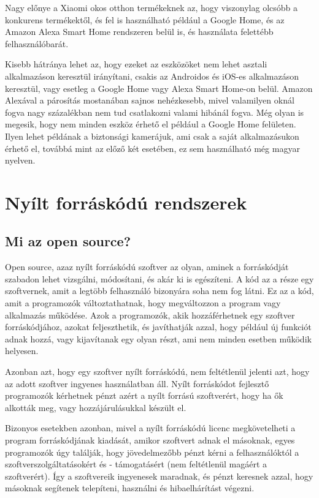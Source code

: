 \documentclass[
]{thesis-ekf}
\theoremstyle{definition}
\theoremstyle{remark}
\begin{document}
	Nagy előnye a Xiaomi okos otthon termékeknek az, hogy viszonylag olcsóbb a konkurens termékektől, és fel is használható például a Google Home, és az Amazon Alexa Smart Home rendszeren belül is, és használata felettébb felhasználóbarát.
	
	Kisebb hátránya lehet az, hogy ezeket az eszközöket nem lehet asztali alkalmazáson keresztül irányítani, csakis az Androidos és iOS-es alkalmazáson keresztül, vagy esetleg a Google Home vagy Alexa Smart Home-on belül. Amazon Alexával a párosítás mostanában sajnos nehézkesebb, mivel valamilyen oknál fogva nagy százalékban nem tud csatlakozni valami hibánál fogva. Még olyan is megesik, hogy nem minden eszköz érhető el például a Google Home felületen. Ilyen lehet példának a biztonsági kamerájuk, ami csak a saját alkalmazásukon érhető el, továbbá mint az előző két esetében, ez sem használható még magyar nyelven.
	
	\section{Nyílt forráskódú rendszerek}
	\subsection{Mi az open source?}
	Open source, azaz nyílt forráskódú szoftver az olyan, aminek a forráskódját szabadon lehet vizsgálni, módosítani, és akár ki is egészíteni. A kód az a része egy szoftvernek, amit a legtöbb felhasználó bizonyára soha nem fog látni. Ez az a kód, amit a programozók változtathatnak, hogy megváltozzon a program vagy alkalmazás működése. Azok a programozók, akik hozzáférhetnek egy szoftver forráskódjához, azokat feljeszthetik, és javíthatják azzal, hogy például új funkciót adnak hozzá, vagy kijavítanak egy olyan részt, ami nem minden esetben működik helyesen.\cite{what-is-open-source}
	
	Azonban azt, hogy egy szoftver nyílt forráskódú, nem feltétlenül jelenti azt, hogy az adott szoftver ingyenes használatban áll. Nyílt forráskódot fejlesztő programozók kérhetnek pénzt azért a nyílt forrású szoftverért, hogy ha ők alkották meg, vagy hozzájárulásukkal készült el. 
	
	Bizonyos esetekben azonban, mivel a nyílt forráskódú licenc megkövetelheti a program forráskódjának kiadását, amikor szoftvert adnak el másoknak, egyes programozók úgy találják, hogy jövedelmezőbb pénzt kérni a felhasználóktól a szoftverszolgáltatásokért és - támogatásért (nem feltétlenül magáért a szoftverért). Így a szoftvereik ingyenesek maradnak, és pénzt keresnek azzal, hogy másoknak segítenek telepíteni, használni és hibaelhárítást végezni.\cite{what-is-open-source}
	
\end{document}
